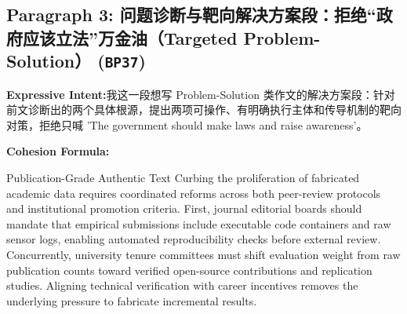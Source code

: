 \subsection*{Paragraph 3: 问题诊断与靶向解决方案段：拒绝“政府应该立法”万金油（Targeted Problem-Solution） (\texttt{BP37})}
\noindent\textbf{Expressive Intent:}\enspace 我这一段想写 Problem-Solution 类作文的解决方案段：针对前文诊断出的两个具体根源，提出两项可操作、有明确执行主体和传导机制的靶向对策，拒绝只喊 'The government should make laws and raise awareness'。\par
\noindent\textbf{Cohesion Formula:}\par\vspace{4pt}
\begin{ExampleBox}{Publication-Grade Authentic Text}
Curbing the proliferation of fabricated academic data requires coordinated reforms across both peer-review protocols and institutional promotion criteria. First, journal editorial boards should mandate that empirical submissions include executable code containers and raw sensor logs, enabling automated reproducibility checks before external review. Concurrently, university tenure committees must shift evaluation weight from raw publication counts toward verified open-source contributions and replication studies. Aligning technical verification with career incentives removes the underlying pressure to fabricate incremental results.
\end{ExampleBox}
